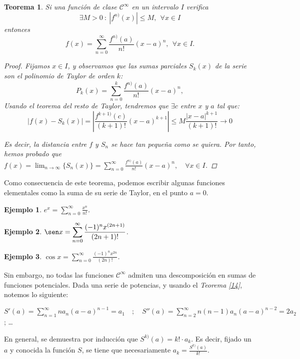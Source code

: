 \documentclass[11pt, a4paper]{article}
\theoremstyle{theorem-style}
\newtheorem{nth}{Teorema}[section]
\theoremstyle{definition-style}
\theoremstyle{remark-style}
\theoremstyle{example-style}
\newtheorem{ejemplo}{Ejemplo}[section]
\begin{document}
\begin{nth} \label{15}
  Si una funci\'on de clase $\mathcal{C}^\infty$ en un intervalo $I$ verifica 
  \[
    \exists M>0 \ : \  |f^{n)}(x)|\leq M, \ \ \forall x\in I
  \]
  entonces 
  \[
    f(x) = \sum_{n=0}^\infty \frac{f^{n)} (a)}{n!} (x-a)^n , \ \ \forall x\in I.
  \]

  \begin{proof}
    Fijamos $x \in I$, y observamos que las sumas parciales $S_k(x)$ de la serie son el polinomio de Taylor de orden $k$: 
    \[
      P_k(x) =  \sum_{n=0}^k \frac{f^{n)} (a)}{n!} (x-a)^n,
    \]
    Usando el teorema del resto de Taylor, tendremos que $\exists c$ entre $x$ y $a$ tal que:
    \[
      |f(x)-S_k(x)| =\left| \frac{ f^{k+1)} (c)}{(k+1)!} (x-a)^{k+1}\right| \leq  M \frac{|x-a|^{k+1}}{(k+1)!} \to 0
    \]

    Es decir, la distancia entre $f$ y $S_n$ se hace tan pequeña como se quiera. Por tanto, hemos probado que $\displaystyle f(x) = \lim_{n \to \infty} \{S_n(x)\} = \sum_{n=0}^{\infty} \frac{f^{n)} (a)}{n!} (x-a)^n, \quad \forall x \in I$.
  \end{proof}
\end{nth}
Como consecuencia de este teorema, podemos escribir algunas funciones elementales como la suma de su serie de Taylor, en el punto $a = 0$.

\begin{ejemplo}
  $e^x = \displaystyle \sum_{n=0}^\infty  \frac{x^n}{n!}$. 
\end{ejemplo}

\begin{ejemplo}
  $\sen x = \displaystyle \sum_{n=0}^\infty   \frac{(-1)^n x^{(2n+1)}}{(2n+1)!}$.
\end{ejemplo}
\begin{ejemplo}
  $\cos x = \displaystyle \sum_{n=0}^\infty   \frac{(-1)^n x^{2n}}{(2n)!}$.
\end{ejemplo}


Sin embargo, no todas las funciones $\mathcal{C}^{\infty}$ admiten una descomposición en sumas de funciones potenciales. Dada una serie de potencias, y usando el \textit{Teorema \ref{14}}, notemos lo siguiente:

$\displaystyle S'(a) = \sum_{n=1}^{\infty} na_n(a-a)^{n-1} = a_1 \quad ; \quad S''(a) = \sum_{n=2}^{\infty} n(n-1)a_n(a-a)^{n-2} = 2a_2$ \quad ; \quad \dots

En general, se demuestra por inducción que $S^{k)} (a) = k! \cdot a_k$. Es decir, fijado un $a$ y conocida la función $S$, se tiene que necesariamente $a_k = \frac{S^{k)}(a)}{k!}$.
\end{document}
